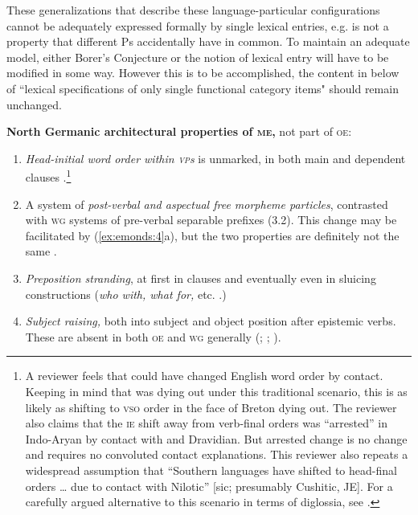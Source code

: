\documentclass[output=paper]{LSP/langsci}
\begin{document}
These generalizations that describe these language-particular configurations cannot be adequately expressed formally by single lexical entries, e.g.  is not a property that different Ps accidentally have in common. To maintain an adequate model, either Borer’s Conjecture or the notion of lexical entry will have to be modified in some way. However this is to be accomplished, the content in  below of “lexical specifications of only single functional category items" should remain unchanged.\largerpage[2]

\ea \label{ex:emonds:4}%
     

      \textbf{North Germanic architectural properties of \textsc{me},} not part of \textsc{oe}:


\begin{enumerate}[label={(\alph*)}]
\item \textit{Head-initial word order within \textsc{vp}s} is unmarked, in both main and dependent clauses \citep[3.1]{EmondsFaarlund2014}.\footnote{A reviewer feels that  could have changed English word order by contact. Keeping in mind that  was dying out under this traditional scenario, this is as likely as  shifting to \textsc{vso} order in the face of Breton dying out. The reviewer also claims that the \textsc{ie} shift away from verb-final orders was ``arrested'' in Indo-Aryan by contact with  and Dravidian. But arrested change is no change and requires no convoluted contact explanations.  This reviewer also repeats a widespread assumption that ``Southern  languages have shifted to head-final orders … due to contact with Nilotic'' [sic; presumably Cushitic, JE]. For a carefully argued alternative to this scenario in terms of diglossia, see \citet{Ouhalla2015}.} 
\item A system of \textit{post-verbal  and aspectual free morpheme particles}, contrasted with \textsc{wg} systems of pre-verbal separable prefixes (3.2). This change may be facilitated by (\ref{ex:emonds:4}a), but the two properties are definitely not the same \citep{Emonds2016}.
\item \textit{Preposition stranding}, at first in  clauses and eventually even in sluicing constructions (\textit{who with, what for,} etc. \citealt[3.7--3.8]{EmondsFaarlund2014}.)
\item \textit{Subject raising,} both into subject and object position after epistemic verbs. These are absent in both \textsc{oe} and \textsc{wg} generally (\citealt[221]{Denison1993}; \citealt[82]{Hawkins1986}; \citealt[3.3--3.4]{EmondsFaarlund2014}).

\end{enumerate}
\end{document}
